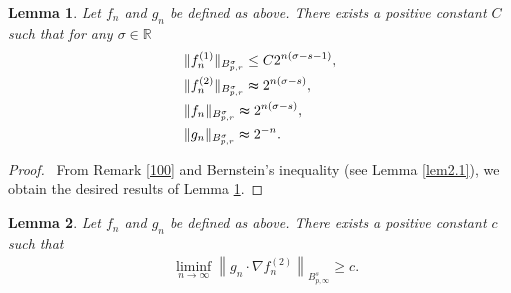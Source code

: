 \documentclass[12pt]{article}
\newtheorem{lemma}{Lemma}[section]
\newcommand{\bal}{\begin{align}}
\newcommand{\bbal}{\begin{align*}}
\newcommand{\na}{\nabla}
\newcommand{\cd}{\cdot}
\newcommand{\R}{\mathbb{R}}
\newcommand{\f}{\left}
\newcommand{\g}{\right}
\begin{document}
\begin{lemma}\label{y1}
Let $f_n$ and $g_n$ be defined as above. There exists a positive constant $C$ such that for any $\sigma\in\R$
\bbal
&\|f_n^{(1)}\|_{B^\sigma_{p,r}}\leq C 2^{n(\sigma-s-1)},\\
&\|f_n^{(2)}\|_{B^\sigma_{p,r}}\thickapprox 2^{n(\sigma-s)},\\
&\|f_{n}\|_{B_{p,r}^{\sigma}}\thickapprox 2^{n(\sigma-s)},\\
&\|g_{n}\|_{B_{p,r}^{\sigma}}\thickapprox 2^{-n}.
\end{align*}
\end{lemma}
\begin{proof}\,
From Remark \ref{100} and Bernstein's inequality (see Lemma \ref{lem2.1}),  we obtain the desired results of Lemma \ref{y1}.
\end{proof}
\begin{lemma}\label{ZZ}
Let $f_n$ and $g_n$ be defined as above. There exists a positive constant $c$ such that
\bal\label{yZ}
&\liminf_{n\rightarrow \infty}\f\|g_n\cd\na f_n^{(2)}\g\|_{B^s_{p,\infty}}\geq c.
\end{align}
\end{lemma}
\end{document}
